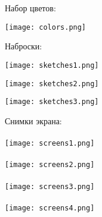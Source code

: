 \documentclass[../document.tex]{subfiles}
\begin{document}
\par Набор цветов:

\texttt{[image: colors.png]}

\par Наброски:

\texttt{[image: sketches1.png]}

\texttt{[image: sketches2.png]}

\texttt{[image: sketches3.png]}

\par Снимки экрана:
\\\\
\texttt{[image: screens1.png]}
\\\\
\texttt{[image: screens2.png]}
\\\\
\texttt{[image: screens3.png]}
\\\\
\texttt{[image: screens4.png]}
\end{document}
